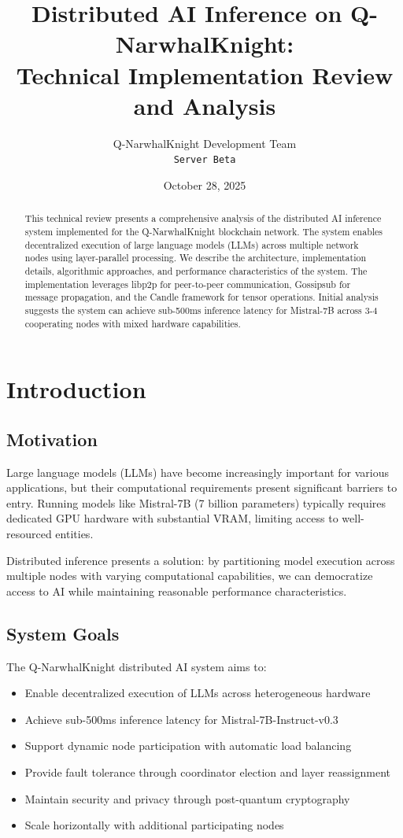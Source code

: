 \documentclass[12pt,a4paper]{article}
\title{\textbf{Distributed AI Inference on Q-NarwhalKnight:\\
Technical Implementation Review and Analysis}}
\author{Q-NarwhalKnight Development Team\\
\texttt{Server Beta}}
\date{October 28, 2025}
\begin{document}
\maketitle

\begin{abstract}
This technical review presents a comprehensive analysis of the distributed AI inference system implemented for the Q-NarwhalKnight blockchain network. The system enables decentralized execution of large language models (LLMs) across multiple network nodes using layer-parallel processing. We describe the architecture, implementation details, algorithmic approaches, and performance characteristics of the system. The implementation leverages libp2p for peer-to-peer communication, Gossipsub for message propagation, and the Candle framework for tensor operations. Initial analysis suggests the system can achieve sub-500ms inference latency for Mistral-7B across 3-4 cooperating nodes with mixed hardware capabilities.
\end{abstract}

\tableofcontents
\newpage

\section{Introduction}

\subsection{Motivation}
Large language models (LLMs) have become increasingly important for various applications, but their computational requirements present significant barriers to entry. Running models like Mistral-7B (7 billion parameters) typically requires dedicated GPU hardware with substantial VRAM, limiting access to well-resourced entities.

Distributed inference presents a solution: by partitioning model execution across multiple nodes with varying computational capabilities, we can democratize access to AI while maintaining reasonable performance characteristics.

\subsection{System Goals}
The Q-NarwhalKnight distributed AI system aims to:
\begin{itemize}
    \item Enable decentralized execution of LLMs across heterogeneous hardware
    \item Achieve sub-500ms inference latency for Mistral-7B-Instruct-v0.3
    \item Support dynamic node participation with automatic load balancing
    \item Provide fault tolerance through coordinator election and layer reassignment
    \item Maintain security and privacy through post-quantum cryptography
    \item Scale horizontally with additional participating nodes
\end{itemize}
\end{document}
